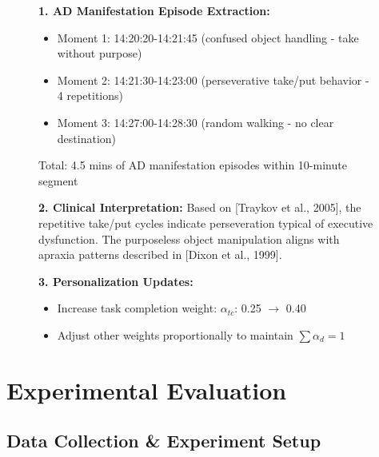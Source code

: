 \documentclass[sigconf, anonymous, 9pt, nonacm]{acmart}
\begin{document}
\begin{figure}[t]
\centering
\begin{tcolorbox}[title=\data{Example} of LLM Output Structure, fontupper=\small]
\textbf{1. AD Manifestation Episode Extraction:}
\begin{itemize}[leftmargin=15pt,itemsep=0pt]
\item Moment 1: 14:20:20-14:21:45 (confused object handling - take without purpose)
\item Moment 2: 14:21:30-14:23:00 (perseverative take/put behavior - 4 repetitions)
\item Moment 3: 14:27:00-14:28:30 (random walking - no clear destination)
\end{itemize}
Total: 4.5 mins of AD manifestation episodes within 10-minute segment

\textbf{2. Clinical Interpretation:}
Based on [Traykov et al., 2005], the repetitive take/put cycles indicate 
perseveration typical of executive dysfunction. The purposeless object 
manipulation aligns with apraxia patterns described in [Dixon et al., 1999].

\textbf{3. Personalization Updates:}
\begin{itemize}[leftmargin=15pt,itemsep=0pt]
\item Increase task completion weight: $\alpha_{tc}$: 0.25 $\rightarrow$ 0.40
\item Adjust other weights proportionally to maintain $\sum\alpha_d = 1$
\end{itemize}
\end{tcolorbox}
\vspace{-2.5em}
\end{figure}



















\section{Experimental Evaluation}
\label{sec:results}

\subsection{Data Collection \& Experiment Setup}
\end{document}

